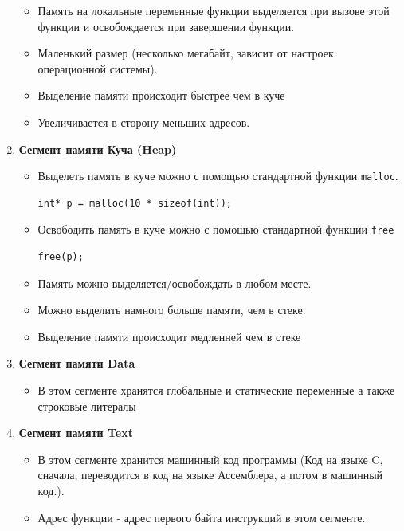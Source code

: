 \documentclass{article}
\begin{document}
\begin{multicols}{2}
\begin{enumerate}
\begin{itemize}
\item Память на локальные переменные функции выделяется при вызове этой функции и освобождается при завершении функции.
\item Маленький размер (несколько мегабайт, зависит от настроек операционной системы).
\item Выделение памяти происходит быстрее чем в куче
\item Увеличивается в сторону меньших адресов.
\end{itemize}
\item \textbf{Сегмент памяти Куча (Heap)} \\
\begin{itemize}
\item Выделеть память в куче можно с помощью стандартной функции \texttt{malloc}. \\
\begin{lstlisting}
int* p = malloc(10 * sizeof(int));
\end{lstlisting}
\item Освободить память в куче можно с помощью стандартной функции \texttt{free}
\begin{lstlisting}
free(p);
\end{lstlisting}
\item Память можно выделяется/освобождать в любом месте.
\item Можно выделить намного больше памяти, чем в стеке.
\item Выделение памяти происходит медленней чем в стеке
\end{itemize}
\end{enumerate}
\end{multicols}

\begin{enumerate}
\setcounter{enumi}{2}

\item \textbf{Сегмент памяти Data}
\begin{itemize}
\item В этом сегменте хранятся глобальные и статические переменные а также строковые литералы
\end{itemize}

\item \textbf{Сегмент памяти Text}
\begin{itemize}
\item В этом сегменте хранится машинный код программы (Код на языке C, сначала, переводится в код на языке Ассемблера, а потом в машинный код.).
\item Адрес функции - адрес первого байта инструкций в этом сегменте.
\end{itemize}
\end{enumerate}
\end{document}
